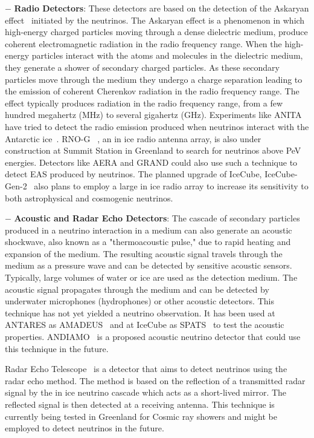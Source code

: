 \begin{description}
  \item $-$ \textbf{Radio Detectors}: These detectors are based on the detection of the Askaryan effect~\cite{Askaryan:1961pfb,PhysRevD.84.103003} initiated by the neutrinos. The Askaryan effect is a phenomenon in which high-energy charged particles moving through a dense dielectric medium, produce coherent electromagnetic radiation in the radio frequency range.  When the high-energy particles interact with the atoms and molecules in the dielectric medium, they generate a shower of secondary charged particles. As these secondary particles move through the medium they undergo a charge separation leading to the emission of coherent Cherenkov radiation in the radio frequency range. The effect typically produces radiation in the radio frequency range, from a few hundred megahertz (MHz) to several gigahertz (GHz). Experiments like ANITA~\cite{ANITA:2008mzi} have tried to detect the radio emission produced when neutrinos interact with the Antarctic ice~\cite{Schoorlemmer_2016}. RNO-G ~\cite{Aguilar_2021}, an in ice radio antenna array, is also under construction at Summit Station in Greenland to search for neutrinos above PeV energies. Detectors like AERA and GRAND could also use such a technique to detect EAS produced by neutrinos. The planned upgrade of IceCube, IceCube-Gen-2~\cite{Aartsen_2021_Gen-2} also plans to employ a large in ice radio array to increase its sensitivity to both astrophysical and cosmogenic neutrinos. 
  
  \item $-$ \textbf{Acoustic and Radar Echo Detectors}:  The cascade of secondary particles produced in a neutrino interaction in a medium can also generate an acoustic shockwave, also known as a "thermoacoustic pulse," due to rapid heating and expansion of the medium. The resulting acoustic signal travels through the medium as a pressure wave and can be detected by sensitive acoustic sensors. Typically, large volumes of water or ice are used as the detection medium. The acoustic signal propagates through the medium and can be detected by underwater microphones (hydrophones) or other acoustic detectors. This technique has not yet yielded a neutrino observation. It has been used at ANTARES as AMADEUS~\cite{LAHMANN2012S216} and at IceCube as SPATS~\cite{Karg_2012} to test the acoustic properties. ANDIAMO~\cite{Marinelli_2022} is a proposed acoustic neutrino detector that could use this technique in the future.
  
  Radar Echo Telescope~\cite{Prohira_2021} is a detector that aims to detect neutrinos using the radar echo method. The method is based on the reflection of a transmitted radar signal by the in ice neutrino cascade which acts as a short-lived mirror. The reflected signal is then detected at a receiving antenna. This technique is currently being tested in Greenland for Cosmic ray showers and might be employed to detect neutrinos in the future.


\end{description}
